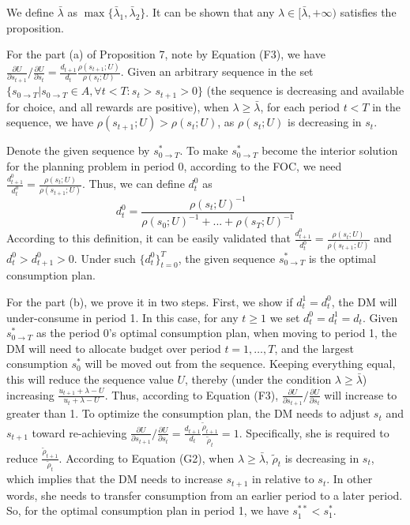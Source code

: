 \documentclass[
  12pt,
]{article}
\begin{document}
We define \(\bar{\lambda}\) as
\(\max\{\bar{\lambda}_1,\bar{\lambda}_2\}\). It can be shown that any
\(\lambda\in[\bar{\lambda},+\infty)\) satisfies the proposition.

For the part (a) of Proposition 7, note by Equation (F3), we have
\(\frac{\partial U}{\partial s_{t+1}}/\frac{\partial U}{\partial s_t}=\frac{d_{t+1}}{d_t} \frac{\rho(s_{t+1};U)}{\rho(s_t;U)}\).
Given an arbitrary sequence in the set
\(\{s_{0\rightarrow T}|s_{0\rightarrow T}\in A, \forall t<T:s_t>s_{t+1}>0\}\)
(the sequence is decreasing and available for choice, and all rewards
are positive), when \(\lambda \geq \bar{\lambda}\), for each period
\(t<T\) in the sequence, we have \(\rho(s_{t+1};U)>\rho(s_t;U)\), as
\(\rho(s_t;U)\) is decreasing in \(s_t\).

Denote the given sequence by \(s_{0\rightarrow T}^*\). To make
\(s_{0\rightarrow T}^*\) become the interior solution for the planning
problem in period 0, according to the FOC, we need
\(\frac{d_{t+1}^0}{d_t^0}=\frac{\rho(s_t;U)}{\rho(s_{t+1};U)}\). Thus,
we can define \(d_t^0\) as\[
d_t^0 = \frac{\rho(s_t;U)^{-1}}{\rho(s_0;U)^{-1}+...+\rho(s_T;U)^{-1}}
\]According to this definition, it can be easily validated that
\(\frac{d_{t+1}^0}{d_t^0}=\frac {\rho(s_t;U)}{\rho(s_{t+1};U)}\) and
\(d_t^0>d_{t+1}^0>0\). Under such \(\{d_t^0\}_{t=0}^T\), the given
sequence \(s_{0\rightarrow T}^*\) is the optimal consumption plan.

For the part (b), we prove it in two steps. First, we show if
\(d_t^1=d_t^0\), the DM will under-consume in period 1. In this case,
for any \(t\geq 1\) we set \(d_t^0=d_t^1=d_t\). Given
\(s_{0\rightarrow T}^*\) as the period 0's optimal consumption plan,
when moving to period 1, the DM will need to allocate budget over period
\(t=1,…,T\), and the largest consumption \(s_0^*\) will be moved out
from the sequence. Keeping everything equal, this will reduce the
sequence value \(U\), thereby (under the condition
\(\lambda\geq \bar{\lambda}\)) increasing
\(\frac{u_{t+1}+\lambda-U}{u_t+\lambda-U}\). Thus, according to Equation
(F3),
\(\frac{\partial U}{\partial s_{t+1}}/\frac{\partial U}{\partial s_{t}}\)
will increase to greater than 1. To optimize the consumption plan, the
DM needs to adjust \(s_t\) and \(s_{t+1}\) toward re-achieving
\(\frac{\partial U}{\partial s_{t+1}}/\frac{\partial U}{\partial s_{t}}=\frac{d_{t+1}}{d_t}\frac{\tilde{\rho}_{t+1}}{\tilde{\rho}_t}=1\).
Specifically, she is required to reduce
\(\frac{\tilde{\rho}_{t+1}}{\tilde{\rho}_t}\). According to Equation
(G2), when \(\lambda\geq\bar{\lambda}\), \(\tilde{\rho}_t\) is
decreasing in \(s_t\), which implies that the DM needs to increase
\(s_{t+1}\) in relative to \(s_t\). In other words, she needs to
transfer consumption from an earlier period to a later period. So, for
the optimal consumption plan in period 1, we have \(s_1^{**}<s_1^*\).
\end{document}

